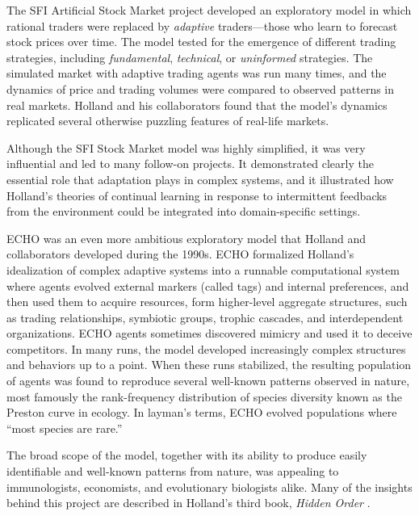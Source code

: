 \documentclass{sig-alternate}
\begin{document}
The SFI Artificial Stock Market project \cite{Arthur1997b,Palmer1994}
developed an exploratory model in which rational
traders were replaced by \emph{adaptive} traders---those who learn to
forecast stock prices over time.  The model tested for the
emergence of different trading strategies, including
\emph{fundamental}, \emph{technical}, or \emph{uninformed}
strategies. The simulated market with adaptive trading agents was run
many times, and the dynamics of price and trading volumes were
compared to observed patterns in real markets.  Holland and his
collaborators found that the model's dynamics replicated several
otherwise puzzling features of real-life markets.

Although the SFI Stock Market model was highly simplified, it was very
influential and led to many follow-on projects.  It 
demonstrated clearly the essential role that adaptation plays in complex
systems, and it illustrated how Holland's theories of continual learning
in response to intermittent feedbacks from the environment could be
integrated into domain-specific settings.

ECHO \cite{Holland1999,Hraber1997} was an even more ambitious exploratory model
that Holland and collaborators developed during the 1990s. 
ECHO formalized Holland's idealization of complex adaptive systems
into a runnable computational system where agents evolved external
markers (called tags) and internal preferences, and then used them to
acquire resources, form higher-level aggregate structures, such as
trading relationships, symbiotic groups, trophic cascades, and
interdependent organizations.  ECHO agents sometimes discovered
mimicry and used it to deceive competitors.  In many runs, the model
developed increasingly complex structures and behaviors up to a point.
When these runs stabilized, the resulting population of agents was
found to reproduce several well-known patterns observed in nature,
most famously the rank-frequency distribution of species diversity
known as the Preston curve in ecology.  In layman's terms, ECHO
evolved populations where ``most species are rare.''

The broad scope of the model, together with its ability to produce
easily identifiable and well-known patterns from nature, was appealing
to immunologists, economists, and evolutionary biologists alike.  Many
of the insights behind this project are described in Holland's third
book, \emph{Hidden Order} \cite{Holland1995}.  
\end{document}
